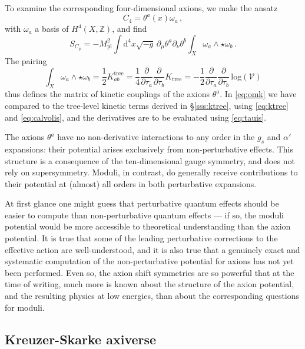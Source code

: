 \documentclass[12pt,a4wide]{article}
\def\d{\mathrm{d}}
\begin{document}
To examine the corresponding four-dimensional axions, we make the ansatz 
\begin{equation}
C_4 = \theta^a(x) \omega_a\,,
\end{equation} with $\omega_a$ a basis of $H^4(X,\mathbb{Z})$,
and find
\begin{equation}
S_{C_p} = - M_{\text{pl}}^2 \int \d^{4} x \sqrt{-g}\, \partial_{\mu} \theta^a \partial_{\nu}\theta^b \int_X \omega_a \wedge \star \omega_b\,.
\end{equation} 
The pairing 
\begin{equation}\label{eq:omk}
\int_X \omega_a \wedge \star \omega_b = \frac{1}{2} K^{\text{tree}}_{ab} = \frac{1}{4} \frac{\partial}{\partial \tau_a}\frac{\partial}{\partial \tau_b} K_{\text{tree}} = -\frac{1}{2} \frac{\partial}{\partial \tau_a}\frac{\partial}{\partial \tau_b}\,\text{log}(\mathcal{V})
\end{equation}
thus defines the matrix of kinetic couplings of the axions $\theta^a$.
In \eqref{eq:omk} we have compared to the tree-level kinetic terms derived in \S\ref{sss:ktree}, using \eqref{eq:ktree} and  \eqref{eq:calvolis}, and the derivatives are to be evaluated using \eqref{eq:tauis}. 




The axions $\theta^a$ have no non-derivative interactions to any order in the $g_s$ and $\alpha'$ expansions: their potential arises exclusively from non-perturbative effects.  This structure is a consequence of the ten-dimensional gauge symmetry, and does not rely on supersymmetry.  Moduli, in contrast, do generally receive contributions to their potential at (almost) all orders in both perturbative expansions.  

At first glance one might guess that perturbative quantum effects should be easier to compute than non-perturbative quantum effects --- if so, the moduli potential would be more accessible to theoretical understanding than the axion potential.
It is true that some of the leading perturbative corrections to the effective action are well-understood, and it is also true that a genuinely exact and systematic computation of the non-perturbative potential for axions has not yet been performed.
Even so, the axion shift symmetries are so powerful that at the time of writing, much more is known about the structure of the axion potential, and the resulting physics at low energies, than about the corresponding questions for moduli.  


\subsection{Kreuzer-Skarke axiverse}
\end{document}
